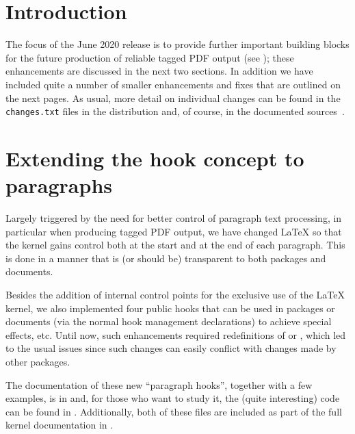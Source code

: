 \documentclass{ltnews}
\providecommand\tubcommand[1]{}
\begin{document}
\tubcommand{\addtolength\textheight{4.2pc}}   %

\maketitle
{ \spaceskip=3.33pt  \tableofcontents}

\setlength{}


\medskip


\section{Introduction}

The focus of the June 2020 release is to provide further important
building blocks for the future production of
reliable tagged PDF output
(see \cite{33:blueprint}); these enhancements
are discussed in the next two
sections. In addition we have included quite
a number of smaller enhancements and
fixes that are outlined on the next pages. As usual, more detail 
on individual changes can be found in the \texttt{changes.txt} files
in the distribution and, of course, in the documented
sources~\cite{33:source2e}.





\section{Extending the hook concept to paragraphs}

Largely triggered by the need for better control of paragraph text
processing, in particular when producing tagged PDF output, we have
changed \LaTeX{} so that the kernel gains control both at the start
and at the end of each paragraph. This is done in a manner that is (or
should be) transparent to both packages and documents.

Besides the addition of internal control points for the exclusive use
of the \LaTeX{} kernel, we also implemented four public hooks that can
be used in packages or documents (via the normal hook management
declarations) to achieve special effects, etc.  Until now, such
enhancements required redefinitions of  or ,
which led to the usual issues since such changes can easily conflict
with changes made by other packages.

The documentation of these new \enquote{paragraph hooks}, together
with a few examples, is in  and, for those who
want to study it, the (quite interesting) code can be found in
. Additionally, both of these files are included
as part of the full kernel documentation in .
\end{document}
